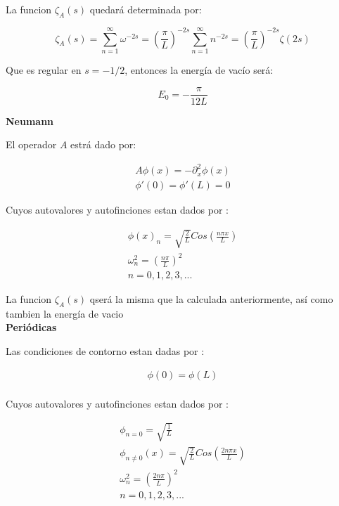 La funcion $\zeta _A (s)$ quedará determinada por:

\begin{equation}
\zeta _A (s) = 
\sum _{n=1} ^{\infty} \omega ^{-2s} =  
\left( \frac{\pi}{L} \right) ^{-2s} \sum _{n=1} ^{\infty} n ^{-2s} = 
\left( \frac{\pi}{L} \right) ^{-2s} \zeta (2s)
\end{equation}

Que es regular en $s=-1/2$, entonces la energía de vacío será:

\begin{equation}
E _0 = - \frac{\pi}{12 L}
\end{equation}

\textbf{Neumann}

El operador $A$ estrá dado por:

\begin{equation}
\begin{array}{c}
	A \phi (x) = - \partial _x ^2 \phi (x) \\
    \phi ' (0) = \phi ' (L) = 0 
\end{array}
\end{equation}



Cuyos autovalores y autofinciones estan dados por  : 

\begin{equation}
\begin{array}{c}
	\phi (x) _n = \sqrt{\frac{2}{L}} Cos( \frac{n \pi x}{L} ) \\
	\omega _n ^2 = \left( \frac{n \pi }{L} \right) ^2 \\
	n = 0,1,2,3, ...
\end{array}
\end{equation}

La funcion $\zeta _A (s)$ qserá la misma que la calculada anteriormente, así como tambien la energía de vacio \\

\textbf{Periódicas}

Las condiciones de contorno estan dadas por : 

\begin{equation}
\begin{array}{c}
    \phi (0) = \phi (L)  \\ 
\end{array}
\end{equation}

Cuyos autovalores y autofinciones estan dados por  : 

\begin{equation}
\begin{array}{c}
	\phi _{n=0} = \sqrt{\frac{1}{L}} \\ 
	\phi _{n \neq 0 } (x) = \sqrt{\frac{2}{L}} Cos( \frac{2 n \pi x}{L} ) \\
	\omega _n ^2 = \left( \frac{2 n \pi }{L} \right) ^2 \\
	n = 0,1,2,3, ...
\end{array}
\end{equation}

